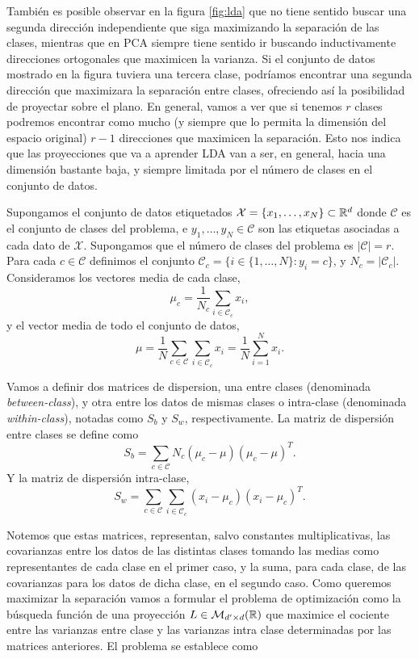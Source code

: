 También es posible observar en la figura \ref{fig:lda} que no tiene sentido buscar una segunda dirección independiente que siga maximizando la separación de las clases, mientras que en PCA siempre tiene sentido ir buscando inductivamente direcciones ortogonales que maximicen la varianza. Si el conjunto de datos mostrado en la figura tuviera una tercera clase, podríamos encontrar una segunda dirección que maximizara la separación entre clases, ofreciendo así la posibilidad de proyectar sobre el plano. En general, vamos a ver que si tenemos $r$ clases podremos encontrar como mucho (y siempre que lo permita la dimensión del espacio original) $r-1$ direcciones que maximicen la separación. Esto nos indica que las proyecciones que va a aprender LDA van a ser, en general, hacia una dimensión bastante baja, y siempre limitada por el número de clases en el conjunto de datos.

Supongamos el conjunto de datos etiquetados $\mathcal{X} = \{x_1,\dots,x_N\} \subset \mathbb{R}^d$ donde $\mathcal{C}$ es el conjunto de clases del problema, e $y_1,\dots,y_N \in \mathcal{C}$ son las etiquetas asociadas a cada dato de $\mathcal{X}$. Supongamos que el número de clases del problema es $|\mathcal{C}| = r$. Para cada $c \in \mathcal{C}$ definimos el conjunto $\mathcal{C}_c = \{ i \in \{1,\dots,N\} \colon y_i = c \}$, y $N_c = |\mathcal{C}_c|$. Consideramos los vectores media de cada clase,
\[\mu_c = \frac{1}{N_c} \sum_{i \in \mathcal{C}_c} x_i,\]
y el vector media de todo el conjunto de datos,
\[\mu = \frac{1}{N}\sum_{c \in \mathcal{C}}\sum_{i \in \mathcal{C}_c}x_i = \frac{1}{N}\sum_{i=1}^N x_i. \]

Vamos a definir dos matrices de dispersion, una entre clases (denominada \emph{between-class}), y otra entre los datos de mismas clases o intra-clase (denominada \emph{within-class}), notadas como $S_b$ y $S_w$, respectivamente. La matriz de dispersión entre clases se define como
\begin{equation}
    S_b = \sum_{c \in \mathcal{C}} N_c(\mu_c - \mu)(\mu_c - \mu)^T.
\end{equation}
Y la matriz de dispersión intra-clase,
\begin{equation}
    S_w = \sum_{c \in \mathcal{C}} \sum_{i \in \mathcal{C}_c}(x_i- \mu_c)(x_i - \mu_c)^T.
\end{equation}  

Notemos que estas matrices, representan, salvo constantes multiplicativas, las covarianzas entre los datos de las distintas clases tomando las medias como representantes de cada clase en el primer caso, y la suma, para cada clase, de las covarianzas para los datos de dicha clase, en el segundo caso. Como queremos maximizar la separación vamos a formular el problema de optimización como la búsqueda función de una proyección $L \in \mathcal{M}_{d'\times d}(\mathbb{R})$ que maximice el cociente entre las varianzas entre clase y las varianzas intra clase determinadas por las matrices anteriores. El problema se establece como

